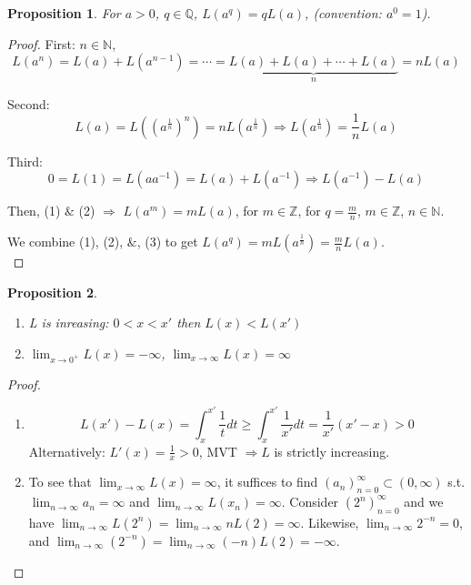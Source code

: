 \documentclass[12pt]{article}
\theoremstyle{plain}
\newtheorem{proposition}{Proposition}[subsection]
\newcommand{\mN}{{\mathbb{N}}}
\newcommand{\mQ}{{\mathbb{Q}}}
\newcommand{\mZ}{{\mathbb{Z}}}
\begin{document}
	\begin{proposition}
		For $a > 0$, $q \in \mQ$, $L(a^q) = qL(a)$, (convention: $a^0=1$).
	\end{proposition}
	\begin{proof}
		First: $n \in \mN$, 
		\setcounter{equation}{0}
		\begin{equation}
			L(a^n) = L(a)+L(a^{n-1}) = \cdots = 
			\underbrace{L(a) + L(a)
			+ \cdots + L(a)}_{n} = nL(a)
		\end{equation}
		
		Second: 
		\begin{equation}
			L(a) = L((a^{\frac1n})^n) = nL(a^{\frac1n}) 
			\Rightarrow L(a^{\frac1n})=\frac1n L(a)
		\end{equation}
		
		Third: 
		\begin{equation}
			0 = L(1) = L(aa^{-1})=L(a)+L(a^{-1})\Rightarrow L(a^{-1})-L(a)
		\end{equation}
		
		Then, (1) $\&$ (2) $\Rightarrow$ $L(a^m) = mL(a)$, for $m \in \mZ$,
		for $q = \frac mn$, $m \in \mZ$, $n\in \mN$. 

		We combine (1), (2), $\&$, (3) to get $L(a^q) = mL(a^{\frac1n})
		=\frac mn L(a)$.\\
	\end{proof}
	
	
	\begin{proposition}
	$ $
		\begin{enumerate}
			\item L is inreasing: $0<x<x'$ then $L(x) < L(x')$ 
			\item $\lim_{x\to 0^+} L(x) = -\infty$, $\lim_{x\to\infty} L(x) 
				=\infty$
		\end{enumerate}
	\end{proposition}
	\begin{proof}
		 $ $
		\begin{enumerate}
			\item 
				\[
					L(x') - L(x) = \int_x^{x'} \frac 1t dt \geq \int_x^{x'}
					\frac1{x'} dt = \frac1{x'}(x'-x) > 0
				\]
				Alternatively: $L'(x) = \frac1x>0$, MVT $\Rightarrow L$ is 
				strictly increasing. 
			
			\item To see that $\lim_{x\to\infty} L(x) = \infty$, it suffices
				to find $(a_n)_{n=0}^{\infty} \subset (0,\infty)$ 
				s.t. $\lim_{n\to\infty} a_n = \infty$ and $\lim_{n\to\infty}
				L(x_n) = \infty$. 
				Consider $(2^n)_{n=0}^{\infty}$ and we have $\lim_{n\to\infty}
				L(2^n) = \lim_{n\to\infty} nL(2) = \infty$. Likewise, 
				$\lim_{n\to\infty} 2^{-n}=0$, and $\lim_{n\to\infty}(2^{-n})
				=\lim_{n\to\infty} (-n)L(2) = -\infty$. 
		 \end{enumerate}

	\end{proof}
\end{document}
